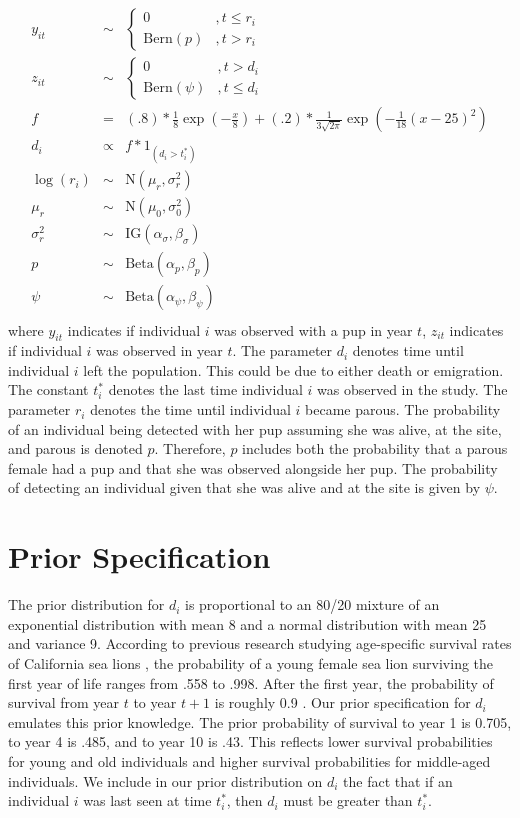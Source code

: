 \documentclass[12pt, a4paper]{article}
\begin{document}
\begin{eqnarray*}
y_{it} & \sim & \begin{cases} 0 & , t \leq r_i \\
\text{Bern}(p) & , t > r_i \end{cases} \\
z_{it} & \sim & \begin{cases} 0 & , t > d_i \\
\text{Bern}(\psi) & , t \leq d_i \end{cases} \\
f &=& (.8)*\frac{1}{8} \exp(-\frac{x}{8}) + (.2)*\frac{1}{3\sqrt{2\pi}} \exp \left(-\frac{1}{18} (x - 25)^2 \right) \\
d_i & \propto & f * 1_{(d_i > t_i^*)} \\
\log(r_i) & \sim & \text{N}(\mu_r, \sigma_r^2) \\
\mu_r & \sim & \text{N}(\mu_0, \sigma_0^2) \\
\sigma_r^2 & \sim & \text{IG}(\alpha_{\sigma}, \beta_{\sigma}) \\
p & \sim & \text{Beta}(\alpha_p, \beta_p) \\
\psi & \sim & \text{Beta}(\alpha_{\psi}, \beta_{\psi} )\\
\end{eqnarray*}
where $y_{it}$ indicates if individual $i$ was observed with a pup in year $t$, $z_{it}$ indicates if individual $i$ was observed in year $t$. The parameter $d_i$ denotes time until individual $i$ left the population. This could be due to either death or emigration. The constant $t_i^*$ denotes the last time individual $i$ was observed in the study. The parameter $r_i$ denotes the time until individual $i$ became parous.
The probability of an individual being detected with her pup assuming she was alive, at the site, and parous is denoted $p$. Therefore, $p$ includes both the probability that a parous female had a pup and that she was observed alongside her pup. The probability of detecting an individual given that she was alive and at the site is given by $\psi$. 

\section{Prior Specification}

The prior distribution for $d_i$ is proportional to an 80/20 mixture of an exponential distribution with mean 8 and a normal distribution with mean 25 and variance 9. According to previous research studying age-specific survival rates of California sea lions \cite{Hernandez}, the probability of a young female sea lion surviving the first year of life ranges from .558 to .998. After the first year, the probability of survival from year $t$ to year $t+1$ is roughly 0.9 \cite{Hernandez}. Our prior specification for $d_i$ emulates this prior knowledge. The prior probability of survival to year 1 is 0.705, to year 4 is .485, and to year 10 is .43. This reflects lower survival probabilities for young and old individuals and higher survival probabilities for middle-aged individuals. We include in our prior distribution on $d_i$ the fact that if an individual $i$ was last seen at time $t_i^*$, then $d_i$ must be greater than $t_i^*$. 
\end{document}
